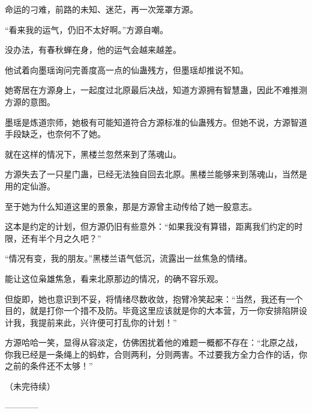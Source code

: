 \begin{this_body}
命运的刁难，前路的未知、迷茫，再一次笼罩方源。

“看来我的运气，仍旧不太好啊。”方源自嘲。

没办法，有春秋蝉在身，他的运气会越来越差。

他试着向墨瑶询问完善度高一点的仙蛊残方，但墨瑶却推说不知。

她寄居在方源身上，一起度过北原最后决战，知道方源拥有智慧蛊，因此不难推测方源的意图。

墨瑶是炼道宗师，她极有可能知道符合方源标准的仙蛊残方。但她不说，方源智道手段缺乏，也奈何不了她。

就在这样的情况下，黑楼兰忽然来到了荡魂山。

方源失去了一只星门蛊，已经无法独自回去北原。黑楼兰能够来到荡魂山，当然是用的定仙游。

至于她为什么知道这里的景象，那是方源曾主动传给了她一股意志。

这本是约定的计划，但方源仍旧有些意外：“如果我没有算错，距离我们约定的时限，还有半个月之久吧？”

“情况有变，我的朋友。”黑楼兰语气低沉，流露出一丝焦急的情绪。

能让这位枭雄焦急，看来北原那边的情况，的确不容乐观。

但旋即，她也意识到不妥，将情绪尽数收敛，抱臂冷笑起来：“当然，我还有一个目的，就是打你一个措不及防。毕竟这里应该就是你的大本营，万一你安排陷阱设计我，我提前来此，兴许便可打乱你的计划！”

方源哈哈一笑，显得从容淡定，仿佛困扰着他的难题一概都不存在：“北原之战，你我已经是一条绳上的蚂蚱，合则两利，分则两害。不过要我方全力合作的话，你之前的条件还不太够！”

（未完待续）

------------

\end{this_body}

